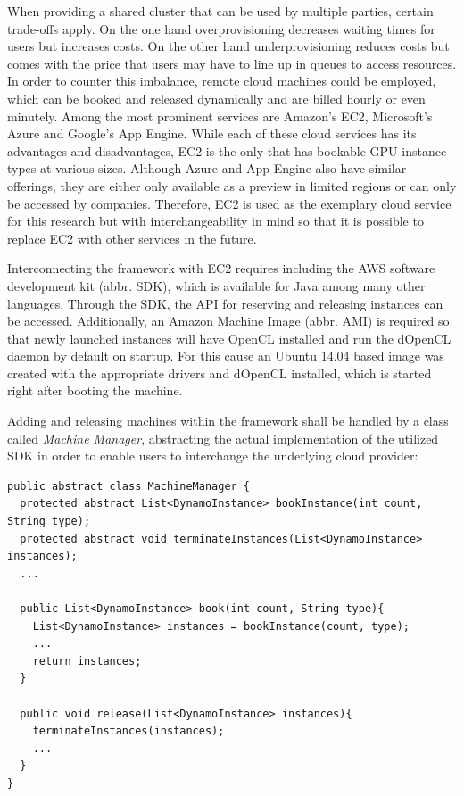 When providing a shared cluster that can be used by multiple parties, certain trade-offs apply. On the one hand overprovisioning decreases waiting times for users but increases costs. On the other hand underprovisioning reduces costs but comes with the price that users may have to line up in queues to access resources. In order to counter this imbalance, remote cloud machines could be employed, which can be booked and released dynamically and are billed hourly or even minutely. Among the most prominent services are Amazon's EC2, Microsoft's Azure and Google's App Engine. While each of these cloud services has its advantages and disadvantages, EC2 is the only that has bookable GPU instance types at various sizes. Although Azure and App Engine also have similar offerings, they are either only available as a preview in limited regions or can only be accessed by companies. Therefore, EC2 is used as the exemplary cloud service for this research but with interchangeability in mind so that it is possible to replace EC2 with other services in the future.

Interconnecting the framework with EC2 requires including the AWS software development kit (abbr. SDK), which is available for Java among many other languages. Through the SDK, the API for reserving and releasing instances can be accessed. Additionally, an Amazon Machine Image (abbr. AMI) is required so that newly launched instances will have OpenCL installed and run the dOpenCL daemon by default on startup. For this cause an Ubuntu 14.04 based image was created with the appropriate drivers and dOpenCL installed, which is started right after booting the machine.

Adding and releasing machines within the framework shall be handled by a class called \textit{Machine Manager}, abstracting the actual implementation of the utilized SDK in order to enable users to interchange the underlying cloud provider:


\begin{lstlisting}[caption=Machine Manager Abstract Implementation,captionpos=b]
public abstract class MachineManager {
  protected abstract List<DynamoInstance> bookInstance(int count, String type);
  protected abstract void terminateInstances(List<DynamoInstance> instances);
  ...

  public List<DynamoInstance> book(int count, String type){
    List<DynamoInstance> instances = bookInstance(count, type);
    ...
    return instances;
  }

  public void release(List<DynamoInstance> instances){
    terminateInstances(instances);
    ...
  }
}
\end{lstlisting}

